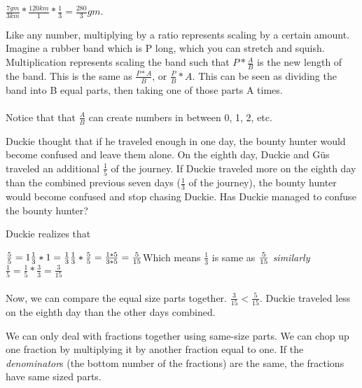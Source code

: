 {$\frac{7 gm}{3 km}\ast\frac{120 km}{1}\ast\frac{1}{3}=\frac{280}{3} gm$.}
{Like any number, multiplying by a ratio represents scaling by a certain amount. Imagine a rubber band which is P long, which you can stretch and squish. Multiplication represents scaling the band such that $P\ast\frac{A}{B}$ is the new length of the band. This is the same as $\frac{P\ast A}{B}$, or $\frac{P}{B}\ast A$. This can be seen as dividing the band into B equal parts, then taking one of those parts A times. \paragraph{} Notice that that $\frac{A}{B}$ can create numbers in between 0, 1, 2, etc.}
{}
{Duckie thought that if he traveled enough in one day, the bounty hunter would become confused and leave them alone. On the eighth day, Duckie and Güs traveled an additional $\frac{1}{5}$ of the journey. If Duckie traveled more on the eighth day than the combined previous seven days ($\frac{1}{3}$ of the journey), the bounty hunter would become confused and stop chasing Duckie. Has Duckie managed to confuse the bounty hunter?}
{Duckie realizes that \begin{center}
    $\frac{5}{5}=1 \linebreak
    \frac{1}{3}\ast 1 = \frac{1}{3} \linebreak
    \frac{1}{3}\ast\frac{5}{5} = \frac{1\ast 5}{3\ast 5} = \frac{5}{15}\linebreak  $Which means $\frac{1}{3}$  is same as  $\frac{5}{15} \linebreak\linebreak$
    \textit{similarly}
   $ \frac{1}{5} = \frac{1}{5}\ast\frac{3}{3} = \frac{3}{15}$
\end{center}
\paragraph{} Now, we can compare the equal size parts together. $\frac{3}{15} < \frac{5}{15}$. Duckie traveled less on the eighth day than the other days combined.}
{We can only deal with fractions together using same-size parts. We can chop up one fraction by multiplying it by another fraction equal to one. If the \textit{denominator}s (the bottom number of the fractions) are the same, the fractions have same sized parts.}
{}
